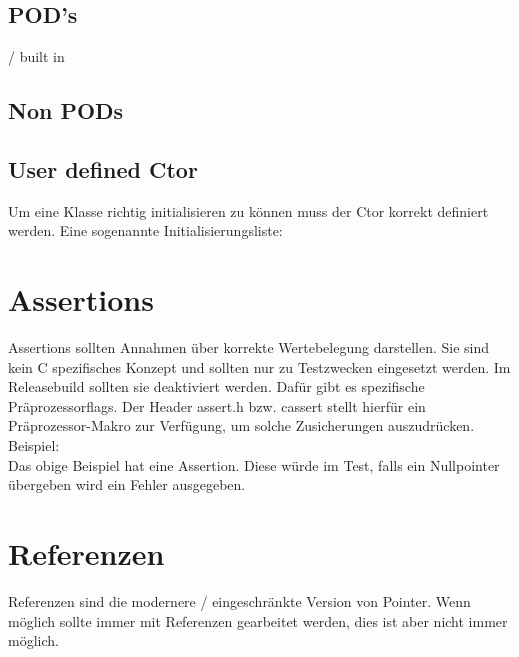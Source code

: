 \subsection{POD's}

 / built in 



\subsection{Non PODs}



\subsection{User defined Ctor}

Um eine Klasse richtig initialisieren zu können muss der Ctor korrekt definiert werden. 
Eine sogenannte Initialisierungsliste:



\section{Assertions}

Assertions sollten Annahmen über korrekte Wertebelegung darstellen. 
Sie sind kein C spezifisches Konzept und sollten nur zu Testzwecken eingesetzt werden. 
Im Releasebuild sollten sie deaktiviert werden. 
Dafür gibt es spezifische Präprozessorflags.
Der Header assert.h bzw. cassert stellt hierfür ein Präprozessor-Makro  zur Verfügung, um solche Zusicherungen auszudrücken.\\
Beispiel:\\



Das obige Beispiel hat eine Assertion. 
Diese würde im Test, falls ein Nullpointer übergeben wird ein Fehler ausgegeben. 

\section{Referenzen}

Referenzen sind die modernere / eingeschränkte Version von Pointer. 
Wenn möglich sollte immer mit Referenzen gearbeitet werden, dies ist aber nicht immer möglich.\\

